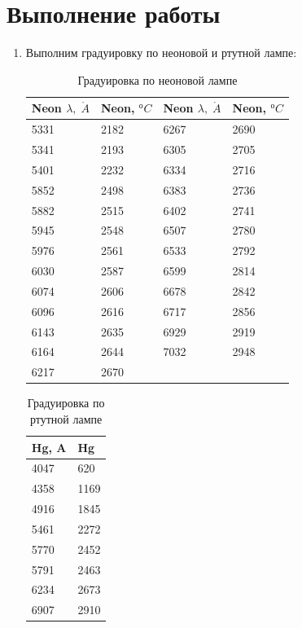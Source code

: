 \documentclass[a4paper]{article}
\begin{document}
\section{Выполнение работы}
\begin{enumerate}
    \item Выполним градуировку по неоновой и ртутной лампе:
    
    \begin{table}[h]
        \centering
        \begin{tabular}{|l|l|l|l|}
        \hline
        Neon  $\lambda,\; \mathring{A}$ & Neon, $^{о}C$ &  Neon  $\lambda,\; \mathring{A}$     &  Neon, $^{о}C$    \\ \hline
        5331    & 2182    & 6267 & 2690 \\ \hline
        5341    & 2193    & 6305 & 2705 \\ \hline
        5401    & 2232    & 6334 & 2716 \\ \hline
        5852    & 2498    & 6383 & 2736 \\ \hline
        5882    & 2515    & 6402 & 2741 \\ \hline
        5945    & 2548    & 6507 & 2780 \\ \hline
        5976    & 2561    & 6533 & 2792 \\ \hline
        6030    & 2587    & 6599 & 2814 \\ \hline
        6074    & 2606    & 6678 & 2842 \\ \hline
        6096    & 2616    & 6717 & 2856 \\ \hline
        6143    & 2635    & 6929 & 2919 \\ \hline
        6164    & 2644    & 7032 & 2948 \\ \hline
        6217    & 2670    &      &      \\ \hline
        \end{tabular}
        \caption{Градуировка по неоновой лампе}
        \end{table}

        \begin{table}[H]
            \centering
            \begin{tabular}{|l|l|}
            \hline
            Hg, A & Hg   \\ \hline
            4047  & 620  \\ \hline
            4358  & 1169 \\ \hline
            4916  & 1845 \\ \hline
            5461  & 2272 \\ \hline
            5770  & 2452 \\ \hline
            5791  & 2463 \\ \hline
            6234  & 2673 \\ \hline
            6907  & 2910 \\ \hline
            \end{tabular}
            \caption{Градуировка по ртутной лампе}
            \end{table}
    


\end{enumerate}
\end{document}
